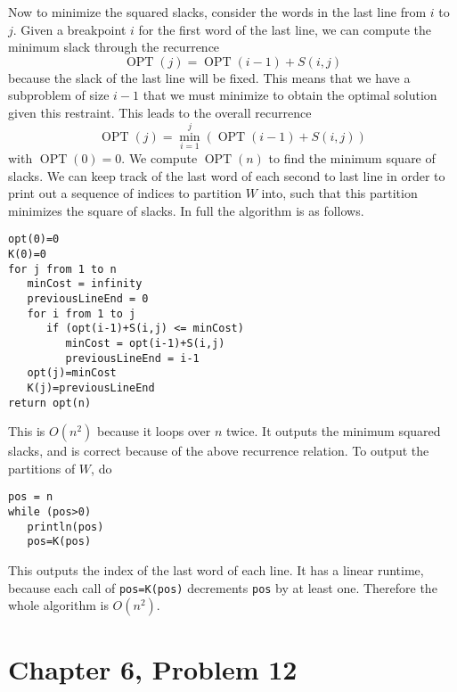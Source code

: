 \documentclass[12pt]{article}
\begin{document}
Now to minimize the squared slacks, consider the words in the last line from \(i\) to \(j\).
Given a breakpoint \(i\) for the first word of the last line, we can compute the minimum slack through
the recurrence
\[\operatorname{OPT}(j)=\operatorname{OPT}(i-1)+S(i,j)\]
because the slack of the last line will be fixed. This means that we have a subproblem of size \(i-1\) that
we must minimize to obtain the optimal solution given this restraint. This leads to the overall recurrence
\[\operatorname{OPT}(j)=\min_{i=1}^j(\operatorname{OPT}(i-1)+S(i,j))\]
with \(\operatorname{OPT}(0)=0\). We compute \(\operatorname{OPT}(n)\) to find the minimum square of slacks.
We can keep track of the last word of each second to last line in order to print out a sequence of indices to
partition \(W\) into, such that this partition minimizes the square of slacks. In full the algorithm is as follows.
\begin{verbatim}
opt(0)=0
K(0)=0
for j from 1 to n
   minCost = infinity
   previousLineEnd = 0
   for i from 1 to j
      if (opt(i-1)+S(i,j) <= minCost)
         minCost = opt(i-1)+S(i,j)
         previousLineEnd = i-1
   opt(j)=minCost
   K(j)=previousLineEnd
return opt(n)
\end{verbatim}
This is \(O(n^2)\) because it loops over \(n\) twice. It outputs the minimum squared slacks, and is correct because of the above
recurrence relation. To output the partitions of \(W\), do
\begin{verbatim}
pos = n
while (pos>0)
   println(pos)
   pos=K(pos)
\end{verbatim}
This outputs the index of the last word of each line. It has a linear runtime, because each call of \texttt{pos=K(pos)} decrements \texttt{pos}
by at least one. Therefore the whole algorithm is \(O(n^2)\).

\pagebreak

\section*{Chapter 6, Problem 12}
\end{document}
